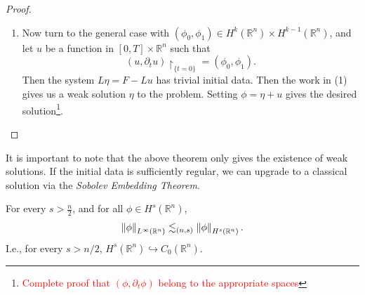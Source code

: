 \documentclass{article}
\begin{document}
\begin{proof}
\begin{enumerate}
\begin{align*}
\begin{split}
			\end{split} 
		\end{align*}
		where (1) the second line follows from the generalized H\"older's inequality\footnote{$\norm{uv}_{L^{1}} \leq \norm{u}_{W^{(-s,p)}}\norm{v}_{W^{(-s, q)}}$, where $p, q$ are conjugate exponents}, (2) the final line follows from incorporating $\int_{0}^{T}\norm{F}_{H^{k - 1}(\mathbb{R}^{n})}\;dt$ into $C$, and using the previous lemma. It is also straightforward to see that the $\Phi$ is linear. Thus, by the Hahn-Banach theorem, there exists $\phi \in (L^{1}((-\infty, T); H^{-k}(\mathbb{R}^{n})))^{\ast} = L^{\infty}((-\infty, T); H^{k}(\mathbb{R}^{n}))$ with $\phi = 0$ for $t < 0$ that extends $\Phi$: $\braket{F, \psi} = \braket{\phi, L^{\ast}\psi}$ for every $\psi \in C_{c}^{\infty}((-\infty, T) \times \mathbb{R}^{n})$. Thus $\phi$ is a \textit{weak solution} (see e.g., Section \ref{subsec:distributions}) to the Cauchy wave problem with trivial data. 
		
		
		\item Now turn to the general case with $(\phi_{0}, \phi_{1})\in H^{k}(\mathbb{R}^{n}) \times H^{k - 1}(\mathbb{R}^{n})$, and let $u$ be a function in $[0,T] \times \mathbb{R}^{n}$ such that 
		\begin{equation*}
			(u, \partial_{t}u)\upharpoonright_{\{t = 0\}} = (\phi_{0}, \phi_{1}). 
		\end{equation*} 
		Then the system $L\eta = F - Lu$ has trivial initial data. Then the work in (1) gives us a weak solution $\eta$ to the problem. Setting $\phi = \eta + u$ gives the desired solution\footnote{\textcolor{red}{Complete proof that $(\phi, \partial_{t}\phi)$ belong to the appropriate spaces}}.  
	\end{enumerate} 
\end{proof} 
\begin{remark}
	It is important to note that the above theorem only gives the existence of weak solutions. If the initial data is sufficiently regular, we can upgrade to a classical solution via the \textit{Sobolev Embedding Theorem}. 
\end{remark} 
\begin{theorem}
	For every $s > \frac{n}{2}$, and for all $\phi \in H^{s}(\mathbb{R}^{n})$, 
	\begin{equation*}
		\left\Vert \phi \right\Vert_{L^{\infty}(\mathbb{R}^{n})} \lesssim_{(n, s)} \left\Vert \phi \right\Vert_{H^{s}(\mathbb{R}^{n})}. 
	\end{equation*} 
	I.e., for every $s > n/2$, $H^{s}(\mathbb{R}^{n}) \hookrightarrow C_{0}(\mathbb{R}^{n})$. 
\end{theorem} 
\end{document}
